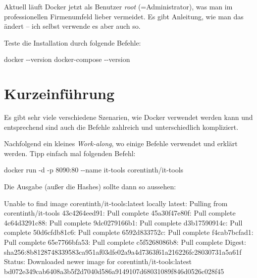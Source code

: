 \documentclass[
  letterpaper,
  DIV=11]{scrreprt}
\newenvironment{Shaded}{\begin{snugshade}}{\end{snugshade}}
\newcommand{\AttributeTok}[1]{\textcolor[rgb]{0.40,0.45,0.13}{#1}}
\newcommand{\ExtensionTok}[1]{\textcolor[rgb]{0.00,0.23,0.31}{#1}}
\newcommand{\NormalTok}[1]{\textcolor[rgb]{0.00,0.23,0.31}{#1}}
\newcommand{\StringTok}[1]{\textcolor[rgb]{0.13,0.47,0.30}{#1}}
\begin{document}
Aktuell läuft Docker jetzt als Benutzer \emph{root} (=Administrator),
was man im professionellen Firmenumfeld lieber vermeidet. Es gibt
Anleitung, wie man das ändert -- ich selbst verwende es aber auch so.

Teste die Installation durch folgende Befehle:

\begin{Shaded}
\begin{Highlighting}[]
\ExtensionTok{docker} \AttributeTok{{-}{-}version}
\ExtensionTok{docker{-}compose} \AttributeTok{{-}{-}version}
\end{Highlighting}
\end{Shaded}

\section{Kurzeinführung}\label{kurzeinfuxfchrung}

Es gibt sehr viele verschiedene Szenarien, wie Docker verwendet werden
kann und entsprechend sind auch die Befehle zahlreich und
unterschiedlich kompliziert.

Nachfolgend ein kleines \emph{Work-along}, wo einige Befehle verwendet
und erklärt werden. Tipp einfach mal folgenden Befehl:

\begin{Shaded}
\begin{Highlighting}[]
\ExtensionTok{docker}\NormalTok{ run }\AttributeTok{{-}d} \AttributeTok{{-}p}\NormalTok{ 8090:80 }\AttributeTok{{-}{-}name}\NormalTok{ it{-}tools corentinth/it{-}tools}
\end{Highlighting}
\end{Shaded}

Die Ausgabe (außer die Hashes) sollte dann so aussehen:

\begin{Shaded}
\begin{Highlighting}[]
\ExtensionTok{Unable}\NormalTok{ to find image }\StringTok{\textquotesingle{}corentinth/it{-}tools:latest\textquotesingle{}}\NormalTok{ locally}
\ExtensionTok{latest:}\NormalTok{ Pulling from corentinth/it{-}tools}
\ExtensionTok{43c4264eed91:}\NormalTok{ Pull complete }
\ExtensionTok{45a30f47e80f:}\NormalTok{ Pull complete }
\ExtensionTok{4c64d3291c88:}\NormalTok{ Pull complete }
\ExtensionTok{9dc0279166b1:}\NormalTok{ Pull complete }
\ExtensionTok{d3b17590914c:}\NormalTok{ Pull complete }
\ExtensionTok{50d6cfdb81c6:}\NormalTok{ Pull complete }
\ExtensionTok{6592d833752c:}\NormalTok{ Pull complete }
\ExtensionTok{f4cab7bcfad1:}\NormalTok{ Pull complete }
\ExtensionTok{65e7766bfa53:}\NormalTok{ Pull complete }
\ExtensionTok{c5f5268086b8:}\NormalTok{ Pull complete }
\ExtensionTok{Digest:}\NormalTok{ sha256:8b8128748339583ca951af03dfe02a9a4d7363f61a216226fc28030731a5a61f}
\ExtensionTok{Status:}\NormalTok{ Downloaded newer image for corentinth/it{-}tools:latest}
\ExtensionTok{bd072e349cab6408a3b5f2d7040d586a9149107d68031089f846d0526c028f45}
\end{Highlighting}
\end{Shaded}
\end{document}
